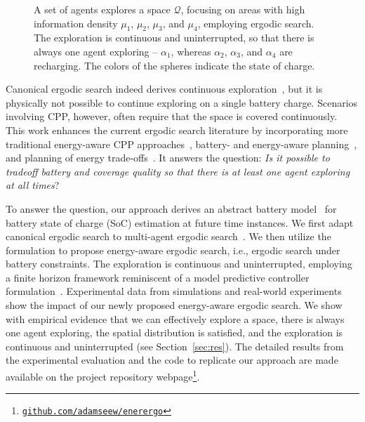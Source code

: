 \documentclass[letterpaper,10pt,conference,twoside]{IEEEtran}
\theoremstyle{definition}
\begin{document}
\begin{figure}[t!]
  \centering
  \hspace*{-.04cm}
  \caption{A set of agents explores a space $\mathcal{Q}$, focusing on areas with high information density $\mu_1$, $\mu_2$, $\mu_3$, and $\mu_4$, employing ergodic search. The exploration is continuous and uninterrupted, %
  so that there is always one agent exploring -- $\alpha_1$, whereas $\alpha_2$, $\alpha_3$, and $\alpha_4$ are recharging. The colors of the spheres indicate the state of charge.}
  \label{fig:abs}
  \vspace*{-.2cm}
\end{figure}

Canonical ergodic search indeed derives continuous exploration~\cite{%
miller2013trajectory,miller2016ergodic,abraham2017ergodic}, but it is physically not possible to continue exploring on a single battery charge. 
Scenarios involving CPP, however, often require that the space is covered continuously.
This work enhances the current ergodic search literature by incorporating more traditional energy-aware CPP approaches~\cite{difranco2015energy,difranco2016coverage,shnaps2016online,cabreira2018energy,wei2018coverage,jensen2021near}, battery- and energy-aware planning~\cite{mei2004energy,mei2005case,kim2005energy,seewald2022energy}, and planning of energy trade-offs~\cite{ondruska2015scheduled,sudhakar2020balancing}. It answers the question: \textit{Is it possible to tradeoff battery and coverage quality so that there is at least one agent exploring %
at all times}?

To answer the question, our approach derives an abstract battery model~\cite{zhao2017observability} for battery state of charge (SoC) estimation at future time instances. We first adapt canonical ergodic search to multi-agent ergodic search~\cite{prabhakar2020ergodic,coffin2022multi}. We then utilize the formulation to propose energy-aware ergodic search, i.e., ergodic search under battery constraints. The exploration is continuous and uninterrupted, employing a finite horizon framework reminiscent of a model predictive controller formulation~\cite{seewald2022energy}. %
Experimental data from simulations and real-world experiments show the impact of our newly proposed energy-aware ergodic search. We show with empirical evidence that we can effectively explore a space, %
there is always one agent exploring, the spatial distribution is satisfied, and the exploration is continuous and uninterrupted (see Section~\ref{sec:res}). The detailed results from the experimental evaluation and the code to replicate our approach are made available on the project repository webpage\footnote{\label{reflink}{\tt\footnotesize\href{https://github.com/adamseew/enerergo}{github.com/adamseew/enerergo}}}.
\end{document}
